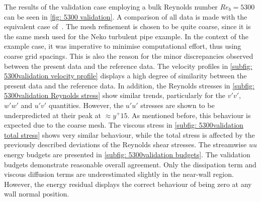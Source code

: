 The results of the validation case employing a bulk Reynolds number $Re_b = 5300$ can be seen in \autoref{fig: 5300 validation}.
A comparison of all data is made with the  equivalent case of~\cite{yaoDirectNumericalSimulations2023}.
The mesh refinement is chosen to be quite coarse, since it is the same mesh used for the Neko turbulent pipe example.
In the context of the example case, it was imperative to minimise computational effort, 
 thus using coarse grid spacings.
This is also the reason for the minor discrepancies observed  between the present data and the reference data.
The velocity profiles in \autoref{subfig: 5300validation velocity profile} displays a high degree of similarity  between the present data and the reference data.
In addition, the Reynolds stresses in \autoref{subfig: 5300validation Reynolds stress} show similar trends, particularly  for the $v'v'$, $w'w'$ and $u'v'$ quantities.
However, the $u'u'$ stresses are shown to be underpredicted  at their peak at $\approx y^+ 15$.
As mentioned before, this behaviour is expected due to the coarse mesh.
The viscous stress in \autoref{subfig: 5300validation total stress} shows very similar behaviour, while the total stress is affected by the previously  described deviations of the Reynolds shear stresses.
The streamwise $uu$ energy budgets  are presented in \autoref{subfig: 5300validation budgets}. The validation budgets demonstrate reasonable overall agreement.
Only the dissipation term and viscous diffusion terms are underestimated slightly in the near-wall region.
However, the energy residual displays the correct behaviour of being zero at any wall normal position.

